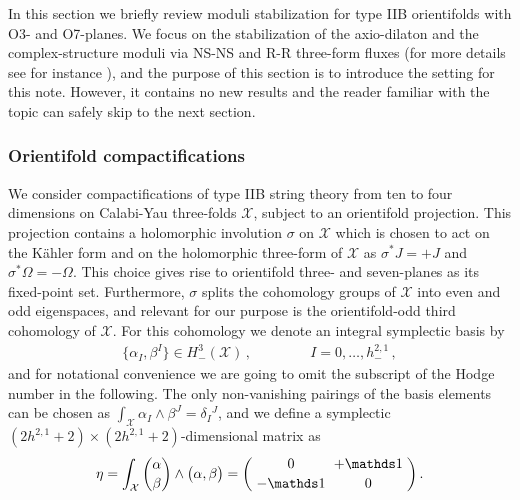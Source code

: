 \documentclass[12pt,a4paper]{article}
\newcommand{\eq}[1]{\begin{equation}
                     \begin{split} #1 \end{split}
                     \end{equation}}
\numberwithin{equation}{section}
\begin{document}
In this section we briefly review moduli stabilization for type IIB orientifolds 
with O3- and O7-planes. We focus on the stabilization of the 
axio-dilaton and the complex-structure moduli via 
NS-NS and R-R three-form fluxes
(for more details see for instance \cite{Grana:2005jc,Douglas:2006es}),
and the purpose of this section is to introduce the setting for this note.
However, it contains no new results and the reader familiar with the topic can  
safely skip to the next section. 





\subsubsection*{Orientifold compactifications}


We  consider compactifications of type IIB string theory from ten to four dimensions 
on Calabi-Yau three-folds $\mathcal X$,
subject to an orientifold projection.
This projection contains a holomorphic involution $\sigma$ on $\mathcal X$
which  is chosen to act on the K\"ahler form and on the holomorphic three-form of $\mathcal X$ 
as $\sigma^* J= + J$ and $\sigma^*\Omega = -\Omega$. This choice gives rise 
to orientifold three- and seven-planes as its fixed-point set. 
Furthermore,  $\sigma$ splits the cohomology groups of $\mathcal X$ 
into even and odd eigen\-spaces, and relevant for our purpose is the orientifold-odd third 
cohomology of $\mathcal X$.
For this cohomology we denote an integral symplectic basis by
\eq{
\label{basis_01}
  \{ \alpha_I , \beta^I \} \in H^3_-(\mathcal X)\,, \hspace{50pt} I = 0, \ldots, h^{2,1}_- \,,
}
and for notational convenience we are going to omit the subscript of the Hodge number
in the following. 
The only non-vanishing pairings of the basis elements can be chosen as
$\int_{\mathcal X} \alpha_I \wedge \beta^J = \delta_I{}^J$, and 
we define a symplectic $(2h^{2,1}+2)\times(2h^{2,1}+2)$-dimensional matrix as
\eq{
  \label{eta}
   \eta =\int_{\mathcal X} \binom{\alpha}{\beta} \wedge  \bigl(\alpha,\beta\bigr) 
   =
   \arraycolsep3pt
   \left( \begin{array}{cc}
   0 & +\mathds 1 \\[2pt] -\mathds 1 & 0 
  \end{array}\right) .
}



\end{document}
